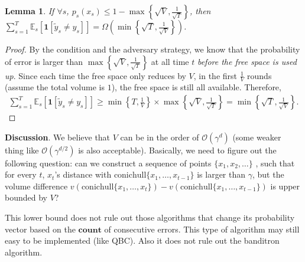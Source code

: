 \documentclass{article}
\newcommand{\one}{\boldsymbol{1}}
\newcommand{\field}[1]{\mathbb{#1}}
\newcommand{\E}{\field{E}}
\newtheorem{lemma}[theorem]{Lemma}
\begin{document}
\begin{lemma}
If $\forall s$, $p_s(x_s)\leq 1-\max\left\{\sqrt{V}, \frac{1}{\sqrt{T}}\right\}$, then $\sum_{s=1}^T \E_s[\one[\tilde{y}_s\neq y_s]] = \Omega\left(\min\left\{\sqrt{T}, \frac{1}{\sqrt{V}}\right\}\right)$.
\end{lemma}

\begin{proof}
By the condition and the adversary strategy, we know that the probability of error is larger than $\max\left\{\sqrt{V},\frac{1}{\sqrt{T}}\right\}$ at all time $t$ \textit{before the free space is used up}. Since each time the free space only reduces by $V$, in the first $\frac{1}{V}$ rounds (assume the total volume is $1$), the free space is still all available. Therefore, 
\begin{align*}
    \sum_{s=1}^T \E_s[\one[\tilde{y}_s\neq y_s]] \geq \min\left\{ T,\frac{1}{V} \right\}\times \max\left\{ \sqrt{V}, \frac{1}{\sqrt{T}} \right\}=\min\left\{\sqrt{T}, \frac{1}{\sqrt{V}}\right\}. 
\end{align*}
\end{proof}

\textbf{Discussion}. We believe that $V$ can be in the order of $\mathcal{O}\left(\gamma^d\right)$ (some weaker thing like $\mathcal{O}\left(\gamma^{d/2}\right)$ is also acceptable). Basically, we need to figure out the following question: can we construct a sequence of points $\{x_1,x_2, \ldots\}$ , such that for every $t$, $x_t$'s distance with $\text{conichull}\{x_1,\ldots, x_{t-1}\}$ is larger than $\gamma$, but the volume difference $v(\text{conichull}\{x_1,\ldots, x_{t}\}) - v(\text{conichull}\{x_1,\ldots, x_{t-1}\})$ is upper bounded by $V$?

This lower bound does not rule out those algorithms that change its probability vector based on the $\textbf{count}$ of consecutive errors. This type of algorithm may still easy to be implemented (like QBC). Also it does not rule out the banditron algorithm. 
\end{document}
